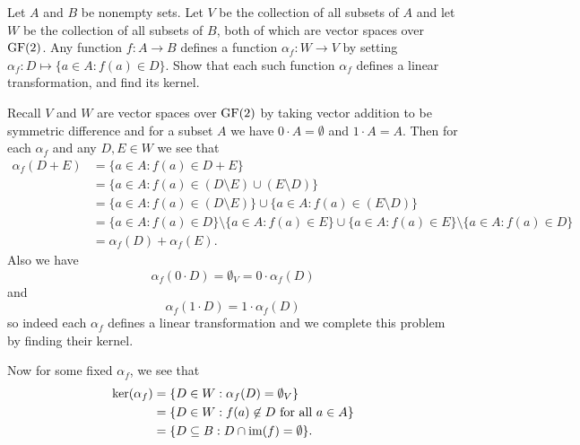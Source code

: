 \begin{problem}[Golan 266]
Let $A$ and $B$ be nonempty sets.  Let $V$ be the collection of all subsets of
$A$ and let $W$ be the collection of all subsets of $B$, both of which are
vector spaces over $\operatorname{GF}(2)$.  Any function $f: A\rightarrow B$ defines a
function $\alpha_f : W \rightarrow V$ by setting 
$\alpha_f: D \mapsto \{a \in A : f(a) \in D\}$.  Show that each such function
$\alpha_f$ defines a linear transformation, and find its kernel.
\end{problem}
 \smallskip
 \begin{solution}
 Recall $V$ and $W$ are vector spaces over $\operatorname{GF}(2)$ by taking vector addition to be symmetric difference and for a subset $A$ we have $0\cdot A = \emptyset$ and $1\cdot A = A$. Then for each $\alpha _f$ and any $D,E\in W$ we see that
 \begin{align*}
 \alpha_f (D+E) &= \{a \in A : f(a) \in D+E\}\\
 &= \{a \in A : f(a) \in (D\setminus E)\cup (E\setminus D) \}\\
&= \{a \in A : f(a) \in (D\setminus E)\} \cup \{a \in A : f(a) \in (E\setminus D) \}\\
&= \{a \in A : f(a) \in D\} \setminus \{a \in A : f(a) \in E\} \cup \{a \in A : f(a) \in E\} \setminus \{a \in A : f(a) \in D\}\\
&= \alpha_f (D) + \alpha_f(E).
 \end{align*}
Also we have
$$
\alpha_f (0 \cdot D) = \emptyset_V = 0 \cdot \alpha_f(D)
$$
and
$$
\alpha_f (1 \cdot D) = 1 \cdot \alpha_f(D)
$$
so indeed each $\alpha_f$ defines a linear transformation and we complete this problem by finding their kernel.

Now for some fixed $\alpha_f$, we see that
\begin{align*}
\operatorname{ker}(\alpha_f) &= \{D\in W : \alpha_f(D) = \emptyset _V\} \\
&= \{D\in W : f(a)\not \in D \text{ for all } a \in A \} \\
&= \{D\subseteq B : D\cap \operatorname{im}(f) = \emptyset \}.
\end{align*}
 \end{solution}






